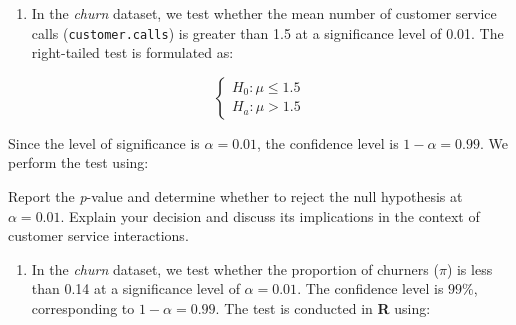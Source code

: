 \documentclass[
  11pt,
]{book}
\makeatletter
\newenvironment{Shaded}{}{}
\newcommand{\AttributeTok}[1]{#1}
\newcommand{\ConstantTok}[1]{#1}
\newcommand{\DecValTok}[1]{#1}
\newcommand{\FloatTok}[1]{#1}
\newcommand{\FunctionTok}[1]{#1}
\newcommand{\NormalTok}[1]{#1}
\newcommand{\OtherTok}[1]{\textcolor[rgb]{0.39,0.39,0.39}{#1}}
\newcommand{\SpecialCharTok}[1]{\textcolor[rgb]{0.39,0.39,0.39}{#1}}
\newcommand{\StringTok}[1]{\textcolor[rgb]{0.39,0.39,0.39}{#1}}
\providecommand{\tightlist}{%
  \setlength{\itemsep}{0pt}\setlength{\parskip}{0pt}}
\newenvironment{kframe}{%
\medskip{}
\setlength{\fboxsep}{.8em}
 \def\at@end@of@kframe{}%
 \ifinner\ifhmode%
  \def\at@end@of@kframe{\end{minipage}}%
  \begin{minipage}{\columnwidth}%
 \fi\fi%
 \def\FrameCommand##1{\hskip\@totalleftmargin \hskip-\fboxsep
 \colorbox{shadecolor}{##1}\hskip-\fboxsep
     \hskip-\linewidth \hskip-\@totalleftmargin \hskip\columnwidth}%
 \MakeFramed {\advance\hsize-\width
   \@totalleftmargin\z@ \linewidth\hsize
   \@setminipage}}%
 {\par\unskip\endMakeFramed%
 \at@end@of@kframe}
\renewenvironment{Shaded}{\begin{kframe}}{\end{kframe}}
\theoremstyle{definition}
\theoremstyle{definition}
\theoremstyle{definition}
\theoremstyle{definition}
\theoremstyle{remark}
\makeatother
\begin{document}
\begin{enumerate}
\def\labelenumi{\arabic{enumi}.}
\setcounter{enumi}{11}
\tightlist
\item
  In the \emph{churn} dataset, we test whether the mean number of customer service calls (\texttt{customer.calls}) is greater than 1.5 at a significance level of 0.01. The right-tailed test is formulated as:
\end{enumerate}

\[
\begin{cases}
  H_0:  \mu \leq 1.5 \\
  H_a:  \mu > 1.5
\end{cases}
\]

Since the level of significance is \(\alpha = 0.01\), the confidence level is \(1-\alpha = 0.99\). We perform the test using:

\begin{Shaded}
\end{Shaded}

Report the \emph{p}-value and determine whether to reject the null hypothesis at \(\alpha=0.01\). Explain your decision and discuss its implications in the context of customer service interactions.

\begin{enumerate}
\def\labelenumi{\arabic{enumi}.}
\setcounter{enumi}{12}
\tightlist
\item
  In the \emph{churn} dataset, we test whether the proportion of churners (\(\pi\)) is less than 0.14 at a significance level of \(\alpha=0.01\). The confidence level is \(99\%\), corresponding to \(1-\alpha = 0.99\). The test is conducted in \textbf{R} using:
\end{enumerate}
\end{document}

